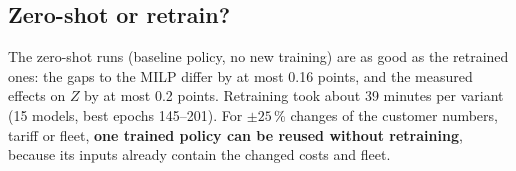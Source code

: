 \subsection{Zero-shot or retrain?}

The zero-shot runs (baseline policy, no new training) are as good as the retrained ones: the gaps to the MILP differ by at most 0.16 points, and the measured effects on $Z$ by at most 0.2 points. Retraining took about 39 minutes per variant (15 models, best epochs 145--201). For $\pm25$\,\% changes of the customer numbers, tariff or fleet, \textbf{one trained policy can be reused without retraining}, because its inputs already contain the changed costs and fleet.

